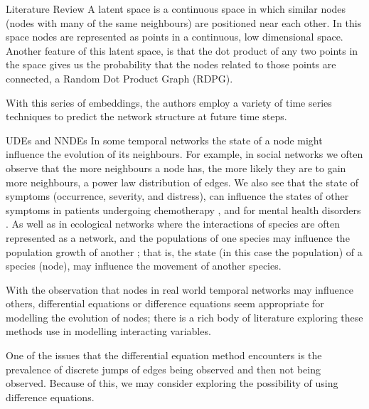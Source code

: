 \documentclass[12pt]{amsbook}
\begin{document}
\begin{chapter}{Literature Review}
            A latent space is a continuous space in which similar nodes (nodes with many of the same neighbours) are positioned near each other. In this space nodes are represented as points in a continuous, low dimensional space. Another feature of this latent space, is that the dot product of any two points in the space gives us the probability that the nodes related to those points are connected, a Random Dot Product Graph (RDPG)\cite{athreya2017statistical}. 
            
            With this series of embeddings, the authors employ a variety of time series techniques to predict the network structure at future time steps.

    \begin{section}{UDEs and NNDEs}
        In some temporal networks the state of a node might influence the evolution of its neighbours. For example, in social networks we often observe that the more neighbours a node has, the more likely they are to gain more neighbours, a power law distribution of edges\cite{zhao2012multi,garg2009evolution}. We also see that the state of symptoms (occurrence, severity, and distress), can influence the states of other symptoms in patients undergoing chemotherapy \cite{papachristou2019network,kalantari2022network}, and for mental health disorders \cite{contreras2020temporal}. As well as in ecological networks where the interactions of species are often represented as a network, and the populations of one species may influence the population growth of another \cite{elton2001animal,volterra1927variazioni}; that is, the state (in this case the population) of a species (node), may influence the movement of another species.
        
        With the observation that nodes in real world temporal networks may influence others, differential equations or difference equations seem appropriate for modelling the evolution of nodes; there is a rich body of literature exploring these methods use in modelling interacting variables. 
        
        One of the issues that the differential equation method encounters is the prevalence of discrete jumps of edges being observed and then not being observed. Because of this, we may consider exploring the possibility of using difference equations.  
    

\end{section}
\end{chapter}
\end{document}
